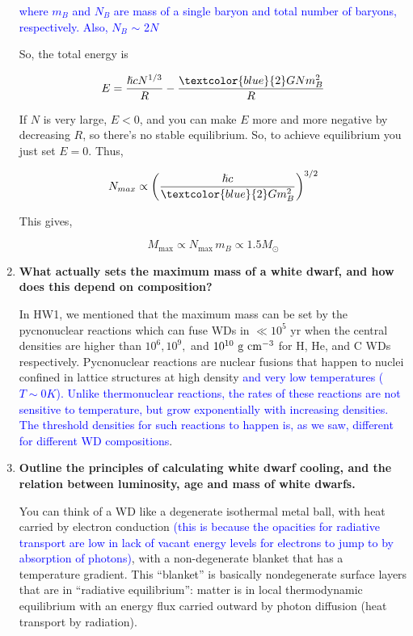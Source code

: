 \documentclass[a4paper]{article}
\begin{document}
\begin{enumerate}
\textcolor{blue}{where $m_B$ and $N_B$ are mass of a single baryon and total number of baryons, respectively. Also, $N_B$ $\sim$ 2$N$}

So, the total energy is 

$$ E = \frac{\hslash c N^{1/3}}{R} - \frac{\textcolor{blue}{2}G N m_B^2}{R} $$

If $N$ is very large, $ E < 0 $, and you can make $E$ more and more negative by decreasing $R$, so there's no stable equilibrium. So, to achieve equilibrium you just set $ E = 0 $. Thus,

$$ N_{max} \propto \left( \frac{\hslash c}{\textcolor{blue}{2}G m_B^2} \right)^{3/2} $$

This gives,

$$ M_{\mathrm{max}} \propto N_{\mathrm{max}} \, m_B \propto 1.5 M_\odot $$

\item \textbf{What actually sets the maximum mass of a white dwarf, and how does this depend on composition?}

In HW1, we mentioned that the maximum mass can be set by the pycnonuclear reactions which can fuse WDs in $\ll 10^5 $ yr when the central densities are higher than $10^6, 10^9,$ and $10^{10} \ \rm g \ cm^{-3}$ for H, He, and C WDs respectively. Pycnonuclear reactions are nuclear fusions that happen to nuclei confined in lattice structures at high density \textcolor{blue}{and very low temperatures ($T \sim 0 K$). Unlike thermonuclear reactions, the rates of these reactions are not sensitive to temperature, but grow exponentially with increasing densities. The threshold densities for such reactions to happen is, as we saw, different for different WD compositions}.

\item \textbf{Outline the principles of calculating white dwarf cooling, and the relation between luminosity, age and mass of white dwarfs.}

You can think of a WD like a degenerate isothermal metal ball, with heat carried by electron conduction \textcolor{blue}{(this is because the opacities for radiative transport are low in lack of vacant energy levels for electrons to jump to by absorption of photons)}, with a non-degenerate blanket that has a temperature gradient. This ``blanket'' is basically nondegenerate surface layers that are in ``radiative equilibrium'': matter is in local thermodynamic equilibrium with an energy flux carried outward by photon diffusion (heat transport by radiation). 


\end{enumerate}
\end{document}

